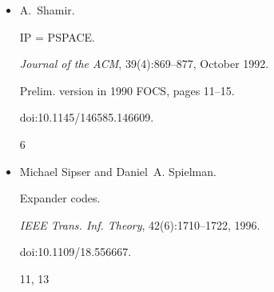 \documentclass[10pt,a4paper]{article}
\begin{document}
\begin{itemize}
R. Raz and S. Safra.


A sub-constant error-probability low-degree test, and a sub-constant
error-probability PCP characterization of NP.


In \emph{STOC 1997}, pages 475–484, 1997.


7




\item[] 
[34]

A. Shamir.


IP = PSPACE.


\emph{Journal of the ACM}, 39(4):869–877, October 1992.


Prelim. version in 1990 FOCS, pages 11–15.


doi:10.1145/146585.146609.


6




\item[] 
[35]

Michael Sipser and Daniel A. Spielman.


Expander codes.


\emph{IEEE Trans. Inf. Theory}, 42(6):1710–1722, 1996.


doi:10.1109/18.556667.


11, 13




\end{itemize}
\end{document}
